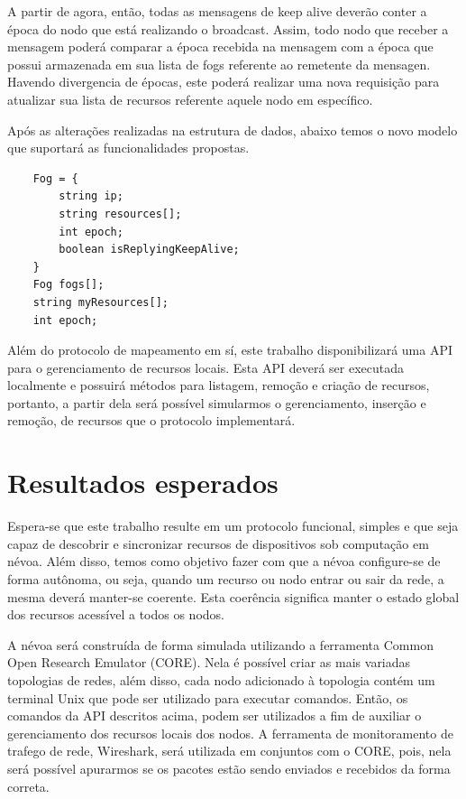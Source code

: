 A partir de agora, então, todas as mensagens de keep alive deverão conter a época do nodo que está realizando o broadcast.
Assim, todo nodo que receber a mensagem poderá comparar a época recebida na mensagem com a época que possui armazenada em sua lista de fogs referente ao remetente da mensagen.
Havendo divergencia de épocas, este poderá realizar uma nova requisição para atualizar sua lista de recursos referente aquele nodo em específico.

Após as alterações realizadas na estrutura de dados, abaixo temos o novo modelo que suportará as funcionalidades propostas.
\begin{verbatim}
    Fog = {
        string ip;
        string resources[];
        int epoch;
        boolean isReplyingKeepAlive;
    }
    Fog fogs[];
    string myResources[];
    int epoch;
\end{verbatim}

Além do protocolo de mapeamento em sí, este trabalho disponibilizará uma API para o gerenciamento de recursos locais.
Esta API deverá ser executada localmente e possuirá métodos para listagem, remoção e criação de recursos, portanto, a partir dela será possível
simularmos o gerenciamento, inserção e remoção, de recursos que o protocolo implementará.

\section{Resultados esperados}

Espera-se que este trabalho resulte em um protocolo funcional, simples e que seja capaz de descobrir e sincronizar recursos de dispositivos sob computação em névoa.
Além disso, temos como objetivo fazer com que a névoa configure-se de forma autônoma, ou seja, quando um recurso ou nodo entrar ou sair da rede, a mesma deverá manter-se coerente.
Esta coerência significa manter o estado global dos recursos acessível a todos os nodos.

A névoa será construída de forma simulada utilizando a ferramenta Common Open Research Emulator (CORE)\cite{coregui}. Nela é possível criar as mais variadas topologias de redes,
além disso, cada nodo adicionado à topologia contém um terminal Unix que pode ser utilizado para executar comandos. Então, os comandos da API descritos acima,
podem ser utilizados a fim de auxiliar o gerenciamento dos recursos locais dos nodos. A ferramenta de monitoramento de trafego de rede, Wireshark\cite{wireshark}, será utilizada em conjuntos com o 
CORE, pois, nela será possível apurarmos se os pacotes estão sendo enviados e recebidos da forma correta.


